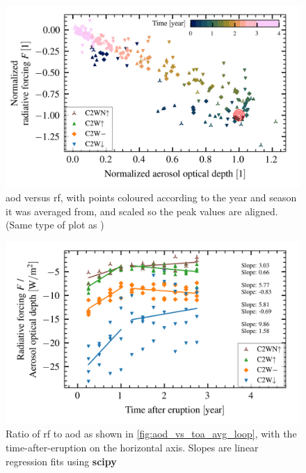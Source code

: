 \documentclass[twocol]{ametsocV5}
\begin{document}
\begin{figure}
  \begin{center}
    \includegraphics[width=0.95\linewidth]{figures/aod_vs_toa_avg_loop_scaled.png}
  \end{center}
  \caption{
    \acrshort{aod} versus \acrshort{rf}, with points coloured according to the year and
    season it was averaged from, and scaled so the peak values are aligned. (Same type
    of plot as \citet{gregory2016})
  }%
  \label{fig:aod_vs_toa_avg_loop_scaled}
\end{figure}

\begin{figure}
  \begin{center}
    \includegraphics[width=0.95\linewidth]{figures/aod_vs_toa_avg_loop_ratio.png}
  \end{center}
  \caption{
    Ratio of \acrshort{rf} to \acrshort{aod} as shown in
    \cref{fig:aod_vs_toa_avg_loop}, with the time-after-eruption on the horizontal axis.
    Slopes are linear regression fits using \textbf{scipy}
  }%
  \label{fig:aod_vs_toa_avg_loop_ratio}
\end{figure}
\end{document}
